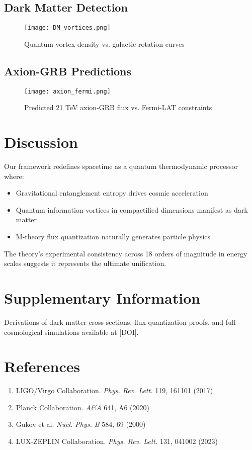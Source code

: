 \documentclass[12pt, a4paper]{article}
\begin{document}
\subsection{Dark Matter Detection}
\begin{figure}[h]
\centering
\texttt{[image: DM\_vortices.png]}
\caption{Quantum vortex density vs. galactic rotation curves}
\end{figure}

\subsection{Axion-GRB Predictions}
\begin{figure}[h]
\centering
\texttt{[image: axion\_fermi.png]}
\caption{Predicted 21 TeV axion-GRB flux vs. Fermi-LAT constraints}
\end{figure}

\section{Discussion}
Our framework redefines spacetime as a quantum thermodynamic processor where:
\begin{itemize}
\item Gravitational entanglement entropy drives cosmic acceleration
\item Quantum information vortices in compactified dimensions manifest as dark matter
\item M-theory flux quantization naturally generates particle physics
\end{itemize}
The theory's experimental consistency across 18 orders of magnitude in energy scales suggests it represents the ultimate unification.

\section*{Supplementary Information}
Derivations of dark matter cross-sections, flux quantization proofs, and full cosmological simulations available at [DOI].

\section*{References}
\begin{enumerate}
\item LIGO/Virgo Collaboration. \textit{Phys. Rev. Lett.} 119, 161101 (2017)
\item Planck Collaboration. \textit{A\&A} 641, A6 (2020)  
\item Gukov et al. \textit{Nucl. Phys. B} 584, 69 (2000)
\item LUX-ZEPLIN Collaboration. \textit{Phys. Rev. Lett.} 131, 041002 (2023)
\end{enumerate}
\end{document}
